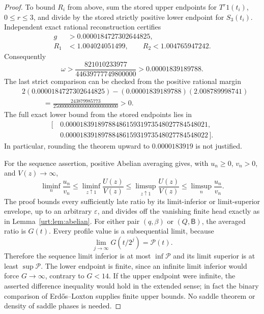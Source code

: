 \documentclass[11pt,letterpaper]{article}
\theoremstyle{remark}\newtheorem{remark}[theorem]{Remark}
\newcommand{\Beta}{\mathsf B}
\newcommand{\Pc}{\mathcal P}\newcommand{\Bc}{\mathcal B}\newcommand{\dd}{\mathrm d}
\begin{document}
\begin{proof}
To bound $R_i$ from above, sum the stored upper endpoints for $T^r1(t_i)$, $0\le r\le3$, and divide by the stored strictly positive lower endpoint for $S_3(t_i)$. Independent exact rational reconstruction certifies
\begin{align*}
 g&>0.0000184727302644825,\\
 R_1&<1.004024051499,\qquad R_2<1.004765947242.
\end{align*}
Consequently
\begin{equation}\label{urt:eq:oscrational}
 \omega>\frac{821010233977}{44639777749800000}
         >0.00001839189788.
\end{equation}
The last strict comparison can be checked from the positive rational margin
\begin{align*}
 &2(0.0000184727302644825)
 -(0.00001839189788)(2.008789998741)\\
 &\hspace{3em}=\frac{243879985773}{25000000000000000000000000}>0.
\end{align*}
The full exact lower bound from the stored endpoints lies in
\[
 \begin{split}
 [\,&0.0000183918978848615931973548027784548021,\\
     &0.0000183918978848615931973548027784548022\,].
 \end{split}
\]
In particular, rounding the theorem upward to $0.0000183919$ is not justified.

For the sequence assertion, positive Abelian averaging gives, with $u_n\ge0$, $v_n>0$, and $V(z)\to\infty$,
\[
 \liminf_n\frac{u_n}{v_n}
 \le\liminf_{z\uparrow1}\frac{U(z)}{V(z)}
 \le\limsup_{z\uparrow1}\frac{U(z)}{V(z)}
 \le\limsup_n\frac{u_n}{v_n}.
\]
The proof bounds every sufficiently late ratio by its limit-inferior or limit-superior envelope, up to an arbitrary $\varepsilon$, and divides off the vanishing finite head exactly as in Lemma~\ref{urt:lem:abelian}. For either pair $(q,\beta)$ or $(Q,\Beta)$, the averaged ratio is $G(t)$. Every profile value is a subsequential limit, because
\[
 \lim_{j\to\infty}G(t/2^j)=\Pc(t).
\]
Therefore the sequence limit inferior is at most $\inf\Pc$ and its limit superior is at least $\sup\Pc$. The lower endpoint is finite, since an infinite limit inferior would force $G\to\infty$, contrary to $G<14$. If the upper endpoint were infinite, the asserted difference inequality would hold in the extended sense; in fact the binary comparison of Erd\H{o}s--Loxton supplies finite upper bounds. No saddle theorem or density of saddle phases is needed.
\end{proof}
\end{document}
